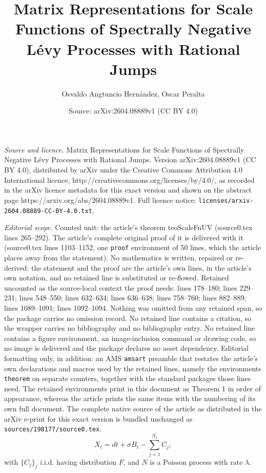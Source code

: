 \documentclass[10pt,a4paper]{amsart}
\title{Matrix Representations for Scale Functions of Spectrally Negative Lévy Processes with Rational Jumps}
\author{Osvaldo Angtuncio Hern\'andez, Oscar Peralta}
\date{Source: arXiv:2604.08889v1 (CC BY 4.0)}
\begin{document}
\maketitle

\noindent\emph{Source and licence.} Matrix Representations for Scale Functions of Spectrally Negative Lévy Processes with Rational Jumps. Version arXiv:2604.08889v1 (CC BY 4.0), distributed by arXiv under the Creative Commons Attribution 4.0 International licence, http://creativecommons.org/licenses/by/4.0/, as recorded in the arXiv licence metadata for this exact version and shown on the abstract page https://arxiv.org/abs/2604.08889v1. Full licence notice: \texttt{licenses/arxiv-2604.08889-CC-BY-4.0.txt}.\par\smallskip

\noindent\textit{Editorial scope.} Counted unit: the article's theorem teoScaleFnUV (source0.tex lines 265--292). The article's complete original proof of it is delivered with it (source0.tex lines 1103--1152, one \texttt{proof} environment of 50 lines, which the article places away from the statement). No mathematics is written, repaired or re-derived: the statement and the proof are the article's own lines, in the article's own notation, and no retained line is substituted or re-flowed.  Retained uncounted as the source-local context the proof needs: lines 178--180; lines 229--231; lines 548--550; lines 632--634; lines 636--638; lines 758--760; lines 882--889; lines 1089--1091; lines 1092--1094.  Nothing was omitted from any retained span, so the package carries no omission record.  No retained line contains a citation, so the wrapper carries no bibliography and no bibliography entry.  No retained line contains a figure environment, an image-inclusion command or drawing code, so no image is delivered and the package declares no asset dependency.  Editorial formatting only, in addition: an AMS \texttt{amsart} preamble that restates the article's own declarations and macros used by the retained lines, namely the environments \texttt{theorem} on separate counters, together with the standard packages those lines need.  The retained environments print in this document as Theorem 1 in order of appearance, whereas the article prints the same items with the numbering of its own full document.  The complete native source of the article as distributed in the arXiv e-print for this exact version is bundled unchanged as \texttt{sources/198177/source0.tex}.
\begin{equation}\label{eqnXTrajectories}
X_t=dt+\sigma B_t-\sum_{j=1}^{N_t}C_j,
\end{equation}with $\{C_j\}_j$  i.i.d. having distribution $F$, and $N$ is a Poisson process with rate $\lambda$.
\end{document}
